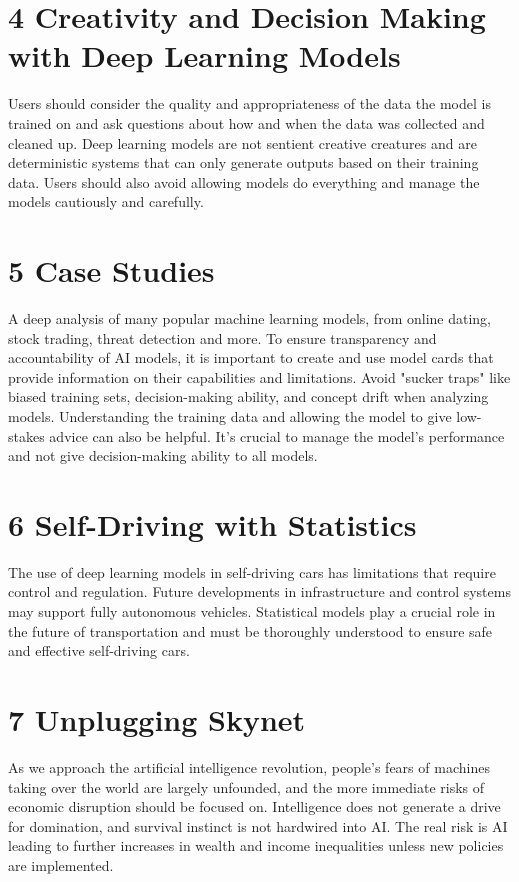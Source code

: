 \section*{4 Creativity and Decision Making with Deep Learning Models}

Users should consider the quality and appropriateness of the data the model is trained on and ask questions about how and when the data was collected and cleaned up. Deep learning models are not sentient creative creatures and are deterministic systems that can only generate outputs based on their training data. Users should also avoid allowing models do everything and manage the models cautiously and carefully.

\section*{5 Case Studies}

A deep analysis of many popular machine learning models, from online dating, stock trading, threat detection and more. To ensure transparency and accountability of AI models, it is important to create and use model cards that provide information on their capabilities and limitations. Avoid "sucker traps" like biased training sets, decision-making ability, and concept drift when analyzing models. Understanding the training data and allowing the model to give low-stakes advice can also be helpful. It's crucial to manage the model's performance and not give decision-making ability to all models.

\section*{6 Self-Driving with Statistics}

The use of deep learning models in self-driving cars has limitations that require control and regulation. Future developments in infrastructure and control systems may support fully autonomous vehicles. Statistical models play a crucial role in the future of transportation and must be thoroughly understood to ensure safe and effective self-driving cars.

\section*{7 Unplugging Skynet}

As we approach the artificial intelligence revolution, people's fears of machines taking over the world are largely unfounded, and the more immediate risks of economic disruption should be focused on. Intelligence does not generate a drive for domination, and survival instinct is not hardwired into AI. The real risk is AI leading to further increases in wealth and income inequalities unless new policies are implemented. 

